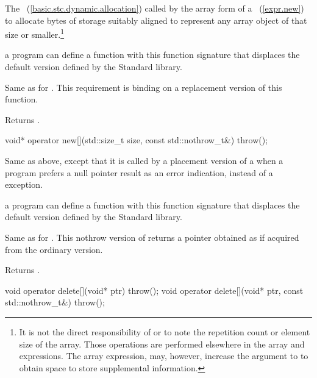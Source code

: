 \begin{itemdescr}
\pnum
\effects
The
~(\ref{basic.stc.dynamic.allocation})
called by the array form of a
~(\ref{expr.new})
to allocate  bytes of storage suitably aligned to represent any array
object of that size or smaller.\footnote{It is not the direct responsibility of
or
to note the repetition count or element size of the array.
Those operations are performed elsewhere in the array
and
expressions.
The array
expression, may, however, increase the  argument to
to obtain space to store supplemental information.}

\pnum
\replaceable
a \Cpp program can define a
function with this function signature that displaces the default version
defined by the \Cpp Standard library.

\pnum
\required
Same as for
.
This requirement is binding on a replacement version of this function.

\pnum
{}
Returns
.
\end{itemdescr}

%
\begin{itemdecl}
void* operator new[](std::size_t size, const std::nothrow_t&) throw();
\end{itemdecl}

\begin{itemdescr}
\pnum
\effects
Same as above, except that it is called by a placement version of a
when a \Cpp program prefers a null pointer result as an error indication,
instead of a
exception.

\pnum
\replaceable
a \Cpp program can define a
function with this function signature that displaces the default version
defined by the \Cpp Standard library.

\pnum
\required
Same as for .
This nothrow version of  returns a pointer obtained
as if acquired from the ordinary version.

\pnum
{}
Returns .
\end{itemdescr}

%
\begin{itemdecl}
void operator delete[](void* ptr) throw();
void operator delete[](void* ptr, const std::nothrow_t&) throw();
\end{itemdecl}

